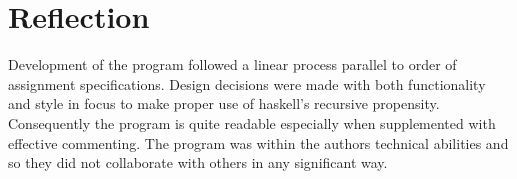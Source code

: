 \documentclass[11pt]{article}
\begin{document}
\section{Reflection}
Development of the program followed a linear process parallel to order of assignment specifications.  Design decisions were made with both functionality and style in focus to make proper use of haskell's recursive propensity. Consequently the program is quite readable especially when supplemented with effective commenting. The program was within the authors technical abilities and so they did not collaborate with others in any significant way.





\end{document}
